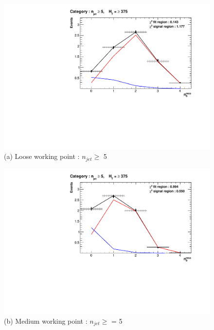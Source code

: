 \begin{figure}[ht]
\footnotesize
\vspace{5mm}
\centering
\begin{minipage}{.51\textwidth}
\centering
\includegraphics[width = 1.0\linewidth]{plots/ThesisPlots/Final_Fit_To_MC_Normal_Loose_HTBin_OneMuon_Template_375_jet_mult_5.pdf}
\centering (a) Loose working point : $n_{jet} \geq$  5 
\end{minipage}
\quad
\begin{minipage}[b]{0.51\linewidth}
\includegraphics[width = 1.0\linewidth]{plots/ThesisPlots/Final_Fit_To_MC_Normal_Medium_HTBin_OneMuon_Template_375_jet_mult_5.pdf}
\centering (b) Medium working point : $n_{jet} \geq$ = 5 
\end{minipage}
\footnotesize
\centering
\begin{minipage}[b]{0.51\linewidth}

\end{minipage}
\end{figure}
